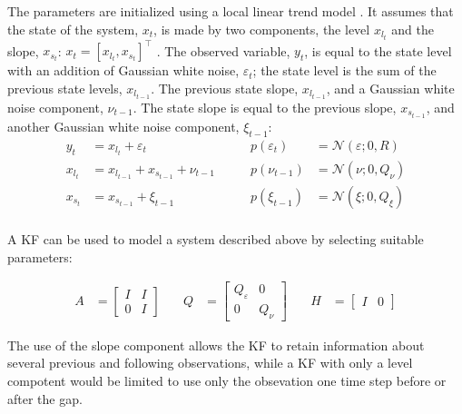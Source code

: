 \documentclass{article}
\newcommand{\norm}[3]{\mathcal{N}\left(#1; #2, #3\right)} %
\begin{document}
The parameters are initialized using a local linear trend model \cite{durbin_time_2012-1}. It assumes that the state of the system, $x_t$, is made by two components, the level $x_{l_t}$ and the slope, $x_{s_t}$: $x_t = [x_{l_t}, x_{s_t}]^\top$ . The observed variable, $y_t$, is equal to the state level with an addition of Gaussian white noise, $\varepsilon_t$; the state level is the sum of the previous state levels, $x_{l_{t-1}}$. The previous state slope, $x_{l_{t-1}}$, and a Gaussian white noise component, $\nu_{t-1}$. The state slope is equal to the previous slope, $x_{s_{t-1}}$, and another Gaussian white noise component, $\xi_{t-1}$:
\begin{equation*}
   \begin{alignedat}{2}
    y_t &= x_{l_t} + \varepsilon_t & p(\varepsilon_t) \quad &= \norm{\varepsilon}{0}{R}\\
    x_{l_t} &= x_{l_{t-1}} + x_{s_{t-1}} + \nu_{t-1} \quad \quad & p(\nu_{t-1}) &= \norm{\nu}{0}{Q_\nu}\\
    x_{s_t} &= x_{s_{t-1}} + \xi_{t-1} \quad & p(\xi_{t-1}) &= \norm{\xi}{0}{Q_\xi} \\
    \end{alignedat}
\end{equation*}

A KF can be used to model a system described above by selecting suitable parameters:

\begin{equation*}\label{eq:local_slope}
\begin{alignedat}{3}
    A &= \begin{bmatrix}I & I \\ 0 & I\end{bmatrix} \quad & Q &= \begin{bmatrix}Q_\varepsilon & 0 \\ 0 & Q_\nu \end{bmatrix}  \quad & H &= \begin{bmatrix}I & 0 \end{bmatrix}
\end{alignedat}
\end{equation*}

The use of the slope component allows the KF to retain information about several previous and following observations, while a KF with only a level compotent would be limited to use only the obsevation one time step before or after the gap.
\end{document}
